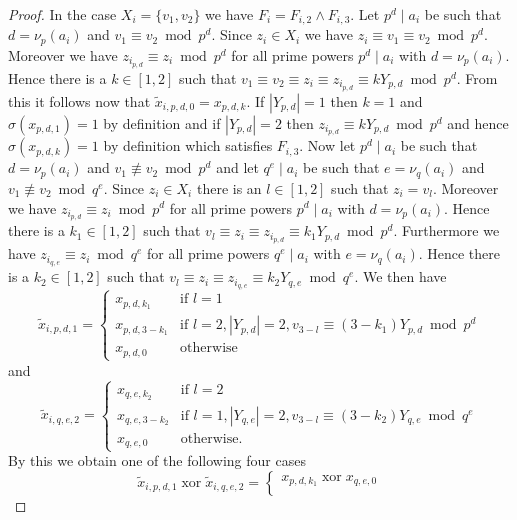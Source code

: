 \documentclass{article}
\DeclareMathOperator{\xor}{xor}
\begin{document}
\begin{proof}
In the case $X_i = \{v_1,v_2\}$ we have $F_i = F_{i,2} \land F_{i,3}$. Let $p^d \mid a_i$ be such that $d = \nu_p(a_i)$ and $v_1 \equiv v_2 \bmod p^d$. Since $z_i \in X_i$ we have $z_i \equiv v_1 \equiv v_2 \bmod p^d$. Moreover we have $z_{i_{p,d}} \equiv z_i \bmod p^d$ for all prime powers $p^d \mid a_i$ with $d = \nu_p(a_i)$. Hence there is a $k \in [1,2]$ such that $v_1 \equiv v_2 \equiv z_i \equiv z_{i_{p,d}} \equiv kY_{p,d} \bmod p^d$. From this it follows now that $\tilde{x}_{i,p,d,0} = x_{p,d,k}$. If $|Y_{p,d}| = 1$ then $k=1$ and $\sigma(x_{p,d,1}) = 1$ by definition and if $|Y_{p,d}| = 2$ then $z_{i_{p,d}} \equiv kY_{p,d} \bmod p^d$ and hence $\sigma(x_{p,d,k}) = 1$ by definition which satisfies $F_{i,3}$. Now let $p^d \mid a_i$ be such that $d = \nu_p(a_i)$ and $v_1 \not \equiv v_2 \bmod p^d$ and let $q^e \mid a_i$ be such that $e = \nu_q(a_i)$ and $v_1 \not \equiv v_2 \bmod q^e$. Since $z_i \in X_i$ there is an $l \in [1,2]$ such that $z_i = v_l$. Moreover we have $z_{i_{p,d}} \equiv z_i \bmod p^d$ for all prime powers $p^d \mid a_i$ with $d = \nu_p(a_i)$. Hence there is a $k_1 \in [1,2]$ such that $v_l \equiv z_i \equiv z_{i_{p,d}} \equiv k_1Y_{p,d} \bmod p^d$. Furthermore we have $z_{i_{q,e}} \equiv z_i \bmod q^e$ for all prime powers $q^e \mid a_i$ with $e = \nu_q(a_i)$. Hence there is a $k_2 \in [1,2]$ such that $v_l \equiv z_i \equiv z_{i_{q,e}} \equiv k_2Y_{q,e} \bmod q^e$. We then have
\begin{displaymath}
\tilde{x}_{i,p,d,1} = \begin{cases}
x_{p,d,k_1} & \text{if } l=1\\
x_{p,d,3-k_1} & \text{if } l=2,|Y_{p,d}|=2,v_{3-l} \equiv (3-k_1)Y_{p,d} \bmod p^d\\
x_{p,d,0} & \text{otherwise}
\end{cases}
\end{displaymath}
and
\begin{displaymath}
\tilde{x}_{i,q,e,2} = \begin{cases}
x_{q,e,k_2} & \text{if } l=2\\
x_{q,e,3-k_2} & \text{if } l=1,|Y_{q,e}|=2,v_{3-l} \equiv (3-k_2)Y_{q,e} \bmod q^e\\
x_{q,e,0} & \text{otherwise}.
\end{cases}
\end{displaymath}
By this we obtain one of the following four cases
\begin{displaymath}
\tilde{x}_{i,p,d,1} \xor \tilde{x}_{i,q,e,2} = \begin{cases}
x_{p,d,k_1} \xor x_{q,e,0}\\

\end{cases}
\end{displaymath}
\end{proof}
\end{document}
